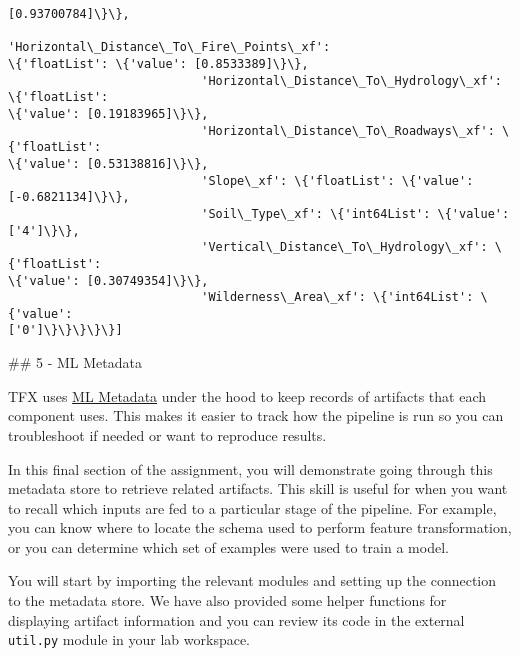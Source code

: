 \documentclass[11pt]{article}
\begin{document}
\begin{Verbatim}[commandchars=\\\{\}]
[0.93700784]\}\},
                           'Horizontal\_Distance\_To\_Fire\_Points\_xf':
\{'floatList': \{'value': [0.8533389]\}\},
                           'Horizontal\_Distance\_To\_Hydrology\_xf': \{'floatList':
\{'value': [0.19183965]\}\},
                           'Horizontal\_Distance\_To\_Roadways\_xf': \{'floatList':
\{'value': [0.53138816]\}\},
                           'Slope\_xf': \{'floatList': \{'value': [-0.6821134]\}\},
                           'Soil\_Type\_xf': \{'int64List': \{'value': ['4']\}\},
                           'Vertical\_Distance\_To\_Hydrology\_xf': \{'floatList':
\{'value': [0.30749354]\}\},
                           'Wilderness\_Area\_xf': \{'int64List': \{'value':
['0']\}\}\}\}\}]
    \end{Verbatim}

    \#\# 5 - ML Metadata

TFX uses \href{https://www.tensorflow.org/tfx/guide/mlmd}{ML Metadata}
under the hood to keep records of artifacts that each component uses.
This makes it easier to track how the pipeline is run so you can
troubleshoot if needed or want to reproduce results.

In this final section of the assignment, you will demonstrate going
through this metadata store to retrieve related artifacts. This skill is
useful for when you want to recall which inputs are fed to a particular
stage of the pipeline. For example, you can know where to locate the
schema used to perform feature transformation, or you can determine
which set of examples were used to train a model.

    You will start by importing the relevant modules and setting up the
connection to the metadata store. We have also provided some helper
functions for displaying artifact information and you can review its
code in the external \texttt{util.py} module in your lab workspace.
\end{document}
